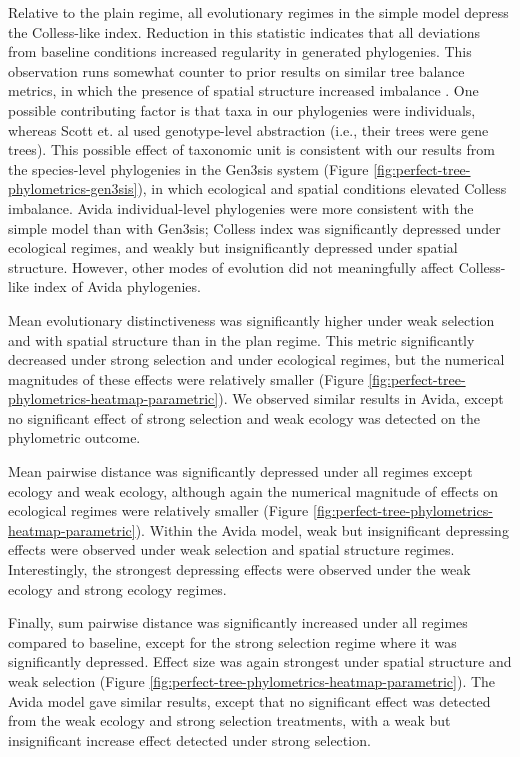 Relative to the plain regime, all evolutionary regimes in the simple model depress the Colless-like index.
Reduction in this statistic indicates that all deviations from baseline conditions increased regularity in generated phylogenies.
This observation runs somewhat counter to prior results on similar tree balance metrics, in which the presence of spatial structure increased imbalance \citep{scottInferringTumorProliferative2020}.
One possible contributing factor is that taxa in our phylogenies were individuals, whereas Scott et. al used genotype-level abstraction (i.e., their trees were gene trees).
This possible effect of taxonomic unit is consistent with our results from the species-level phylogenies in the  Gen3sis system (Figure \ref{fig:perfect-tree-phylometrics-gen3sis}), in which ecological and spatial conditions elevated Colless imbalance.
Avida individual-level phylogenies were more consistent with the simple model than with Gen3sis; Colless index was significantly depressed under ecological regimes, and weakly but insignificantly depressed under spatial structure.
However, other modes of evolution did not meaningfully affect Colless-like index of Avida phylogenies.

Mean evolutionary distinctiveness was significantly higher under weak selection and with spatial structure than in the plan regime.
This metric significantly decreased under strong selection and under ecological regimes, but the numerical magnitudes of these effects were relatively smaller (Figure \ref{fig:perfect-tree-phylometrics-heatmap-parametric}).
We observed similar results in Avida, except no significant effect of strong selection and weak ecology was detected on the phylometric outcome.

Mean pairwise distance was significantly depressed under all regimes except ecology and weak ecology, although again the numerical magnitude of effects on ecological regimes were relatively smaller (Figure \ref{fig:perfect-tree-phylometrics-heatmap-parametric}).
Within the Avida model, weak but insignificant depressing effects were observed under weak selection and spatial structure regimes.
Interestingly, the strongest depressing effects were observed under the weak ecology and strong ecology regimes.

Finally, sum pairwise distance was significantly increased under all regimes compared to baseline, except for the strong selection regime where it was significantly depressed.
Effect size was again strongest under spatial structure and weak selection (Figure \ref{fig:perfect-tree-phylometrics-heatmap-parametric}).
The Avida model gave similar results, except that no significant effect was detected from the weak ecology and strong selection treatments, with a weak but insignificant increase effect detected under strong selection.

